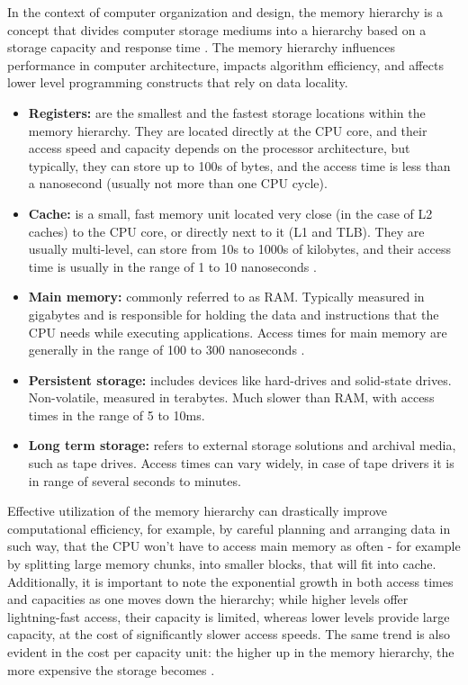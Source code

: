 \noindent In the context of computer organization and design, the memory hierarchy is a concept that divides computer storage mediums into a hierarchy based on a storage capacity and response time
\cite{oldbooksmarthead}. The memory hierarchy influences performance in computer architecture, impacts algorithm efficiency, and affects lower level programming constructs that rely on data locality.

\begin{itemize} %
	\item \textbf{Registers:} are the smallest and the fastest storage locations within the memory hierarchy. They are located directly at the CPU core, and their access speed and capacity depends on the processor
		architecture, but typically, they can store up to 100s of bytes, and the access time is less than a nanosecond (usually not more than one CPU cycle).
	\item \textbf{Cache:} is a small, fast memory unit located very close (in the case of L2 caches) to the CPU core, or directly next to it (L1 and TLB). They are usually multi-level,
		can store from 10s to 1000s of kilobytes, and their access time is usually in the range of 1 to 10 nanoseconds \cite{Patterson2013}.
	\item \textbf{Main memory:} commonly referred to as RAM. Typically measured in gigabytes and is responsible for holding the data and instructions that the CPU needs while executing
		applications. Access times for main memory are generally in the range of 100 to 300 nanoseconds \cite{Hamacher2011}.
	\item \textbf{Persistent storage:} includes devices like hard-drives and solid-state drives. Non-volatile, measured in terabytes. Much slower than RAM, with access times in the range of 5 to 10ms.
	\item \textbf{Long term storage:} refers to external storage solutions and archival media, such as tape drives. Access times can vary widely, in case of tape drivers it is in range of several
		seconds to minutes.
\end{itemize}

\noindent Effective utilization of the memory hierarchy can drastically improve computational efficiency, for example, by careful planning and arranging data in such way, that the
CPU won't have to access main memory as often - for example by splitting large memory chunks, into smaller blocks, that will fit into cache.
Additionally, it is important to note the exponential growth in both access times and capacities as one moves down the hierarchy; while higher levels offer lightning-fast access,
their capacity is limited, whereas lower levels provide large capacity, at the cost of significantly slower access speeds. The same trend is also evident in the cost per capacity unit: the higher
up in the memory hierarchy, the more expensive the storage becomes \cite{comparchaquant}.
%

